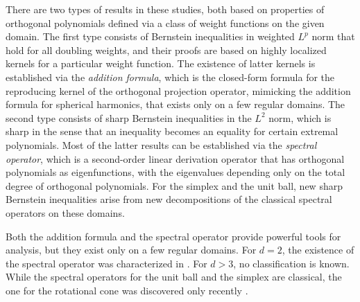 \documentclass{amsart}
\theoremstyle{remark}
\begin{document}
There are two types of results in these studies, both based on properties of orthogonal polynomials defined 
via a class of weight functions on the given domain. The first type consists of Bernstein inequalities in
weighted $L^p$ norm that hold for all doubling weights, and their proofs are based on highly localized
kernels for a particular weight function. The existence of latter kernels is established via the {\it addition 
formula}, which is the closed-form formula for the reproducing kernel of the orthogonal projection operator, 
mimicking the addition formula for spherical harmonics, that exists only on a few regular domains. The 
second type consists of sharp Bernstein inequalities in the $L^2$ norm, which is sharp in the sense that 
an inequality becomes an equality for certain extremal polynomials. Most of the latter results can be established 
via the {\it spectral operator}, which is a second-order linear derivation operator that has orthogonal 
polynomials as eigenfunctions, with the eigenvalues depending only on the total degree of orthogonal 
polynomials. For the simplex and the unit ball, new sharp Bernstein inequalities arise from new decompositions 
of the classical spectral operators on these domains. 

Both the addition formula and the spectral operator provide powerful tools for analysis, but they exist 
only on a few regular domains. For $d =2$, the existence of the spectral operator was characterized in
\cite{KrSh}. %
For $d > 3$, no classification is known. While the spectral operators for the unit ball and the simplex are classical, 
the one for the rotational cone was discovered only recently \cite{X20}. 
\end{document}
